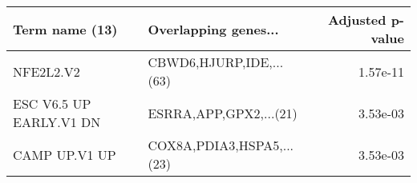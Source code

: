 \begin{tabular}{llr}
\toprule
         Term name (13) &      Overlapping genes... &  Adjusted p-value \\
\midrule
              NFE2L2.V2 &   CBWD6,HJURP,IDE,...(63) &          1.57e-11 \\
ESC V6.5 UP EARLY.V1 DN &    ESRRA,APP,GPX2,...(21) &          3.53e-03 \\
          CAMP UP.V1 UP & COX8A,PDIA3,HSPA5,...(23) &          3.53e-03 \\
\bottomrule
\end{tabular}

